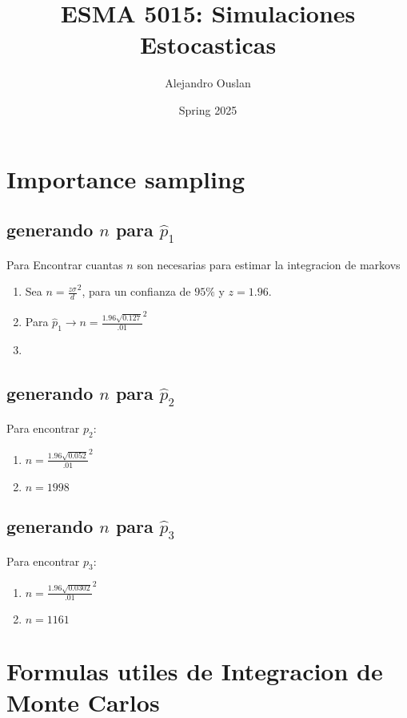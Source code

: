 \documentclass[10pt, oneside]{article}
\title{ESMA 5015: Simulaciones Estocasticas}
\author{Alejandro Ouslan}
\date{Spring 2025}
\begin{document}
\maketitle
\tableofcontents

\vspace{.25in}

\section{Importance sampling}

\subsection{generando $n$ para $\hat{p}_1$}
Para Encontrar cuantas $n$ son necesarias para estimar la integracion de markovs
\begin{enumerate}
	\item Sea $n= \frac{z \sigma}{d}^2$, para un confianza de $95\%$ y $z=1.96$.
	\item Para $\hat{p}_1 \rightarrow n = \frac{1.96 \sqrt{0.127}}{.01}^2$
	\item
\end{enumerate}

\subsection{generando $n$ para $\hat{p}_2$}

Para encontrar $p_2$:

\begin{enumerate}
	\item $n= \frac{1.96 \sqrt{0.052}}{.01}^2$
	\item $n= 1998$
\end{enumerate}

\subsection{generando $n$ para $\hat{p}_3$}

Para encontrar $p_3$:
\begin{enumerate}
	\item $n= \frac{1.96 \sqrt{0.0302}}{.01}^2$
	\item $n= 1161$
\end{enumerate}

\section{Formulas utiles de Integracion de Monte Carlos}
\end{document}
